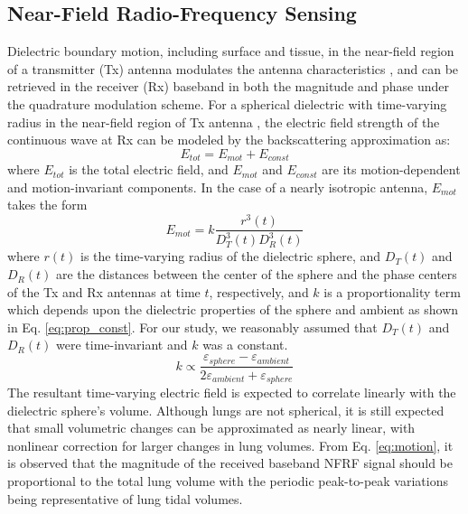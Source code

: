 \documentclass[journal]{IEEEtran}
\begin{document}
\subsection{Near-Field Radio-Frequency Sensing}
Dielectric boundary motion, including surface and tissue, in the near-field region of a transmitter (Tx) antenna modulates the antenna characteristics \cite{huiMonitoringVitalSigns2018}, and can be retrieved in the receiver (Rx) baseband in both the magnitude and phase under the quadrature modulation scheme. For a spherical dielectric with time-varying radius in the near-field region of Tx antenna \cite{zhouBackscatterFieldModel2023}, the electric field strength of the continuous wave at Rx can be modeled by the backscattering approximation as:  
\begin{equation}
    E_{tot} = E_{mot} + E_{const}
\end{equation}
where $E_{tot}$ is the total electric field, and $E_{mot}$ and $E_{const}$ are its motion-dependent and motion-invariant components. In the case of a nearly isotropic antenna, $E_{mot}$ takes the form 
\begin{equation}
    E_{mot} = k \frac{r^{3}(t)}{D_{T}^3(t) D_{R}^3(t)} 
    \label{eq:motion}
\end{equation}
where $r(t)$ is the time-varying radius of the dielectric sphere, and $D_T(t)$ and $D_R(t)$ are the distances between the center of the sphere and the phase centers of the Tx and Rx antennas at time $t$, respectively, and $k$ is a proportionality term which depends upon the dielectric properties of the sphere and ambient as shown in Eq. \ref{eq:prop_const}. For our study, we reasonably assumed that $D_T(t)$ and $D_R(t)$ were time-invariant and $k$ was a constant. 
\begin{equation}
    k \propto \frac{\varepsilon_{sphere} - \varepsilon_{ambient}}{2\varepsilon_{ambient} + \varepsilon_{sphere}}
    \label{eq:prop_const}
\end{equation}
The resultant time-varying electric field is expected to correlate linearly with the dielectric sphere's volume. Although lungs are not spherical, it is still expected that small volumetric changes can be approximated as nearly linear, with nonlinear correction for larger changes in lung volumes. From Eq. \ref{eq:motion}, it is observed that the magnitude of the received baseband NFRF signal should be proportional to the total lung volume with the periodic peak-to-peak variations being representative of lung tidal volumes. 
\end{document}
